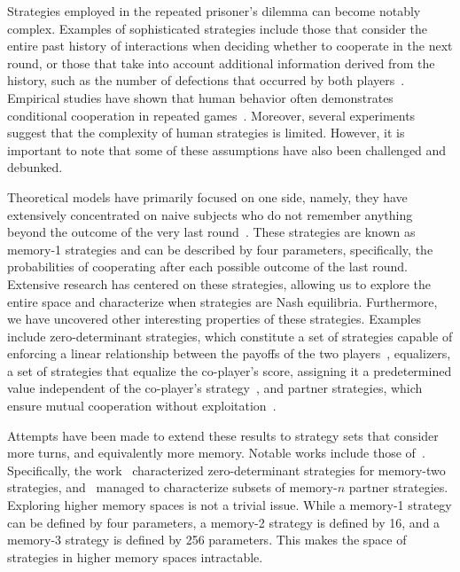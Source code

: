 \documentclass{article}
\theoremstyle{definition}
\begin{document}
Strategies employed in the repeated prisoner's dilemma can become notably
complex. Examples of sophisticated strategies include those that consider the
entire past history of interactions when deciding whether to cooperate in the
next round, or those that take into account additional information derived from
the history, such as the number of defections that occurred by both players~\cite{harper:PLOSONE:2017,
knight:PLOSONE:2018, li:NatureCompSci:2022}.
Empirical studies have shown that human behavior often demonstrates conditional
cooperation in repeated games~\cite{fischbacher:AER:2010, rand:Elsevier:2013,
grujic:ScientificReports:2014}. Moreover, several experiments suggest
that the complexity of human strategies is limited. However, it is important to
note that some of these assumptions have also been challenged and debunked.

Theoretical models have primarily focused on one side, namely, they have
extensively concentrated on naive subjects who do not remember anything beyond
the outcome of the very last round~\cite{nowak:Nature:1992,
glynatsi:scientific:2020, press:PNAS:2012, stewart:scientific:2016,
nowak:Nature:1993, kraines:elsevier:2000, imhof:ProceedingsB:2010,
baek:scientific:2016, hilbe:PNAS:2013, chen:PNASnexus:2023, hilbe:Nature:2018,
akin:EGADS:2016}.
These strategies are known as memory-1 strategies and can be described by four
parameters, specifically, the probabilities of cooperating after each possible
outcome of the last round. Extensive research has centered on these strategies,
allowing us to explore the entire space and characterize when strategies are
Nash equilibria. Furthermore, we have uncovered other interesting properties of
these strategies. Examples include zero-determinant strategies, which constitute
a set of strategies capable of enforcing a linear relationship between the
payoffs of the two players~\cite{press:PNAS:2012}, equalizers, a set of
strategies that equalize the co-player's score, assigning it a predetermined
value independent of the co-player's strategy~\cite{hilbe:PNAS:2013}, and
partner strategies, which ensure mutual cooperation without
exploitation~\cite{hilbe:Nature:2018}.

Attempts have been made to extend these results to strategy sets that consider
more turns, and equivalently more memory. Notable works include those
of~\cite{hilbe:PNAS:2017, ueda:RSOP:2021}. Specifically, the
work~\cite{ueda:RSOP:2021} characterized zero-determinant strategies for
memory-two strategies, and~\cite{hilbe:PNAS:2017} managed to characterize
subsets of memory-$n$ partner strategies. Exploring higher memory spaces is not
a trivial issue. While a memory-1 strategy can be defined by four parameters, a
memory-2 strategy is defined by 16, and a memory-3 strategy is defined by 256
parameters. This makes the space of strategies in higher memory spaces
intractable.
\end{document}
